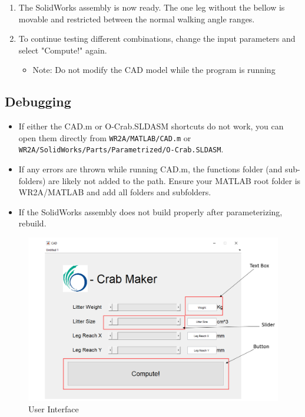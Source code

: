 \begin{enumerate}
\begin{itemize}
        \end{itemize}
    \item The SolidWorks assembly is now ready. The one leg without the bellow is movable and restricted between the normal walking angle ranges.
    \item To continue testing different combinations, change the input parameters and select "Compute!" again. 
    \begin{itemize}
            \item Note: Do not modify the CAD model while the program is running
        \end{itemize}
\end{enumerate}

\subsection{Debugging}
\begin{itemize}
            \item If either the CAD.m or O-Crab.SLDASM shortcuts do not work, you can open them directly from \texttt{WR2A/MATLAB/CAD.m} or \texttt{WR2A/SolidWorks/Parts/Parametrized/O-Crab.SLDASM}.
            \item If any errors are thrown while running CAD.m, the functions folder (and sub-folders) are likely not added to the path. Ensure your MATLAB root folder is WR2A/MATLAB and add all folders and subfolders.
            \item If the SolidWorks assembly does not build properly after parameterizing, rebuild.
\end{itemize}

\begin{figure}[H]
    \centering
    \includegraphics[width=1\textwidth]{6_Appendices/Instruction/GUI_Instructions.PNG}
    \caption{User Interface}
    \label{fig:userInterface}
\end{figure}{}
